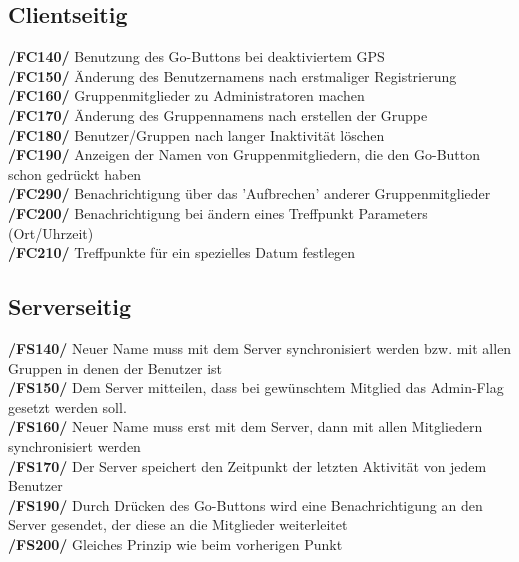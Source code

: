 \subsection{Clientseitig}
     \textbf{/FC140/} Benutzung des Go-Buttons bei deaktiviertem GPS\\
     \textbf{/FC150/} Änderung des Benutzernamens nach erstmaliger Registrierung\\
     \textbf{/FC160/} Gruppenmitglieder zu Administratoren machen                \\
     \textbf{/FC170/} Änderung des Gruppennamens nach erstellen der Gruppe        \\
     \textbf{/FC180/} Benutzer/Gruppen nach langer Inaktivität löschen                     \\
     \textbf{/FC190/} Anzeigen der Namen von Gruppenmitgliedern, die den Go-Button schon gedrückt haben\\
     \textbf{/FC290/} Benachrichtigung über das 'Aufbrechen' anderer Gruppenmitglieder\\
     \textbf{/FC200/} Benachrichtigung bei ändern eines Treffpunkt Parameters (Ort/Uhrzeit)\\
     \textbf{/FC210/} Treffpunkte für ein spezielles Datum festlegen\\
\subsection{Serverseitig}
     \textbf{/FS140/} Neuer Name muss mit dem Server synchronisiert werden bzw. mit allen Gruppen in denen der Benutzer ist\\
     \textbf{/FS150/} Dem Server mitteilen, dass bei gewünschtem Mitglied das Admin-Flag gesetzt werden soll.\\
     \textbf{/FS160/} Neuer Name muss erst mit dem Server, dann mit allen Mitgliedern synchronisiert werden\\
     \textbf{/FS170/} Der Server speichert den Zeitpunkt der letzten Aktivität von jedem Benutzer\\
     \textbf{/FS190/} Durch Drücken des Go-Buttons wird eine Benachrichtigung an den Server gesendet, der diese an die Mitglieder weiterleitet\\
     \textbf{/FS200/} Gleiches Prinzip wie beim vorherigen Punkt\\
